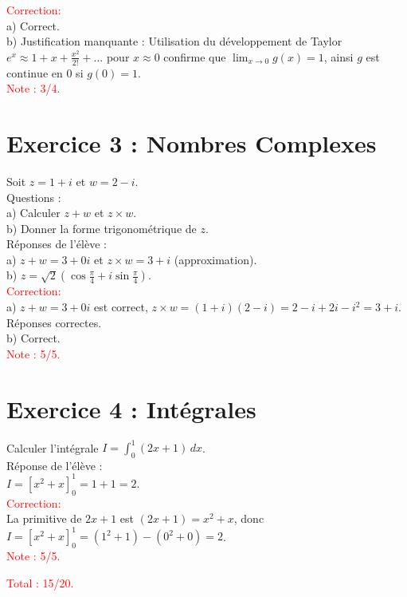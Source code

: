 \documentclass{article}
\begin{document}
\textcolor{red}{Correction:}\\
a) Correct.\\
b) Justification manquante : Utilisation du développement de Taylor $e^x \approx 1 + x + \frac{x^2}{2!} + \ldots$ pour $x \approx 0$ confirme que $\lim_{x \to 0} g(x) = 1$, ainsi $g$ est $\text{continue}$ en ${0}$ si $g(0) = 1$.\\

\textcolor{red}{Note : 3/4.}

\section*{Exercice 3 : Nombres Complexes}
Soit $z = 1 + i$ et $w = 2 - i$.\\
Questions :\\
a) Calculer $z + w$ et $z \times w$.\\
b) Donner la forme trigonométrique de $z$.\\
Réponses de l’élève :\\
a) $z + w = 3 + 0i$ et $z \times w = 3 + i$ (approximation).\\
b) $z = \sqrt{2} \left( \cos\frac{\pi}{4} + i\sin\frac{\pi}{4} \right)$.\\

\textcolor{red}{Correction:}\\
a) $z + w = 3 + 0i$ est correct, $z \times w = (1+i)(2-i) = 2 - i + 2i - i^2 = 3 + i$. Réponses correctes.\\
b) Correct.\\

\textcolor{red}{Note : 5/5.}

\section*{Exercice 4 : Intégrales}
Calculer l’intégrale $I = \int_0^1 (2x + 1) \, dx$.\\
Réponse de l’élève :\\
$I = \left[ x^2 + x \right]_0^1 = 1 + 1 = 2$.\\

\textcolor{red}{Correction:}\\
La primitive de $2x + 1$ est $(2x+1) = x^2 + x$, donc $I = \left[ x^2 + x \right]_0^1 = (1^2 + 1) - (0^2 + 0) = 2$.\\

\textcolor{red}{Note : 5/5.}

\textcolor{red}{Total : 15/20.}
\end{document}
